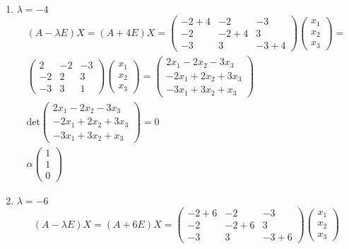 \begin{enumerate}
		\item $\lambda = -4$
			\begin{gather*}
				(A-\lambda E)X = 
				(A+4E)X = 
				\begin{pmatrix}
					-2+4 & -2 & -3 \\
					-2 & -2+4 & 3 \\
					-3 & 3 & -3+4
				\end{pmatrix}
				\begin{pmatrix}
					x_1 \\ x_2 \\ x_3
				\end{pmatrix}
				=\\
				\begin{pmatrix}
					2 & -2 & -3 \\
					-2 & 2 & 3 \\
					-3 & 3 & 1
				\end{pmatrix}
				\begin{pmatrix}
					x_1 \\ x_2 \\ x_3
				\end{pmatrix}
				=
				\begin{pmatrix}
					2x_1 -2x_2 -3x_3 \\
					-2x_1 +2x_2 +3x_3 \\
					-3x_1 + 3x_2 +x_3
				\end{pmatrix}
				\\
				\text{det}
				\begin{pmatrix}
					2x_1 -2x_2 -3x_3 \\
					-2x_1 +2x_2 +3x_3 \\
					-3x_1 + 3x_2 +x_3
				\end{pmatrix}
				= 0
				\\
				\alpha
				\begin{pmatrix}
					1\\1\\0
				\end{pmatrix}
			\end{gather*}
		\item $\lambda = -6$
			\begin{gather*}
				(A-\lambda E)X = 
				(A+6E)X = 
				\begin{pmatrix}
					-2+6 & -2 & -3 \\
					-2 & -2+6 & 3 \\
					-3 & 3 & -3+6
				\end{pmatrix}
				\begin{pmatrix}
					x_1 \\ x_2 \\ x_3

\end{pmatrix}
\end{gather*}
\end{enumerate}
